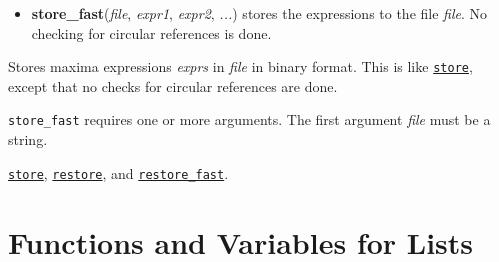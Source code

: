 \documentclass[]{article}
\begin{document}
\vspace{5 pt}
\begin{itemize}
\item[] {\bf store\_fast}({\it file}, {\it expr1}, {\it expr2}, {\it ...})
  stores the expressions to the file {\it file}. No checking for circular references is done. 

\end{itemize}
Stores maxima expressions {\it exprs} in {\it file} in binary format. This is like \hyperlink{store}{{\tt store}}, except that no checks for circular references are done. 

\vspace{5 pt}

   {\tt store\_fast} requires one or more arguments. The first argument {\it file} must be a string.


\vspace{5 pt}


  \hyperlink{store}{{\tt store}}, \hyperlink{restore}{{\tt restore}}, and \hyperlink{restore_fast}{{\tt restore\_fast}}.

\vspace{5 pt}


\section{Functions and Variables for Lists}
\end{document}
